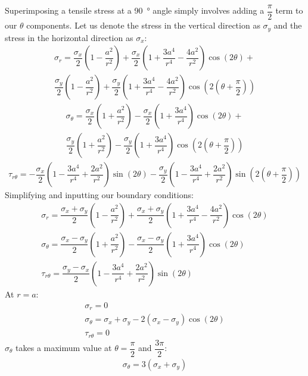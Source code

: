 \documentclass[11pt]{article}
\numberwithin{equation}{section}
\begin{document}
Superimposing a tensile stress at a \SI{90}{\degree} angle simply involves adding a $\dfrac{\pi}{2}$ term to our $\theta$ components. Let us denote the stress in the vertical direction as $\sigma_y$ and the stress in the horizontal direction as $\sigma_x$:
\begin{multline}
    \sigma_r = \dfrac{\sigma_x}{2}\left(1 - \dfrac{a^2}{r^2}\right) + \dfrac{\sigma_x}{2}\left(1+\dfrac{3a^4}{r^4}-\dfrac{4a^2}{r^2}\right)\cos\left(2\theta\right) + \\\dfrac{\sigma_y}{2}\left(1 - \dfrac{a^2}{r^2}\right) + \dfrac{\sigma_y}{2}\left(1+\dfrac{3a^4}{r^4}-\dfrac{4a^2}{r^2}\right)\cos\left(2\left(\theta + \dfrac{\pi}{2}\right)\right)
\end{multline}
\begin{multline}
    \sigma_{\theta} = \dfrac{\sigma_x}{2}\left(1 + \dfrac{a^2}{r^2}\right) - \dfrac{\sigma_x}{2}\left(1 + \dfrac{3a^4}{r^4}\right)\cos \left(2\theta\right) + \\ \dfrac{\sigma_y}{2}\left(1 + \dfrac{a^2}{r^2}\right) - \dfrac{\sigma_y}{2}\left(1 + \dfrac{3a^4}{r^4}\right)\cos \left(2\left(\theta + \dfrac{\pi}{2}\right)\right)
\end{multline}
\begin{gather}
    \tau_{r\theta} = -\dfrac{\sigma_x}{2}\left(1 - \dfrac{3a^4}{r^4}+\dfrac{2a^2}{r^2}\right)\sin\left(2\theta\right) -\dfrac{\sigma_y}{2}\left(1 - \dfrac{3a^4}{r^4}+\dfrac{2a^2}{r^2}\right)\sin\left(2\left(\theta + \dfrac{\pi}{2}\right)\right)
\end{gather}
Simplifying and inputting our boundary conditions:
\begin{gather}
    \sigma_r = \dfrac{\sigma_x + \sigma_y}{2}\left(1 - \dfrac{a^2}{r^2}\right) + \dfrac{\sigma_x + \sigma_y}{2}\left(1 + \dfrac{3a^4}{r^4}- \dfrac{4a^2}{r^2}\right)\cos \left(2\theta\right)\\
    \sigma_{\theta} = \dfrac{\sigma_x - \sigma_y}{2}\left(1 + \dfrac{a^2}{r^2}\right) - \dfrac{\sigma_x - \sigma_y}{2}\left(1 + \dfrac{3a^4}{r^4}\right)\cos\left(2\theta\right)\\
    \tau_{r\theta} = \dfrac{\sigma_y - \sigma_x}{2}\left(1 -\dfrac{3a^4}{r^4}+ \dfrac{2a^2}{r^2}\right)\sin\left(2\theta\right)
\end{gather}
At $r =a$:
\begin{gather}
    \sigma_r = 0\\
    \sigma_{\theta} = \sigma_x + \sigma_y - 2\left(\sigma_x - \sigma_y\right)\cos\left(2\theta\right)\\
    \tau_{r\theta} = 0
\end{gather}
$\sigma_{\theta}$ takes a maximum value at $\theta = \dfrac{\pi}{2}$ and $\dfrac{3\pi}{2}$:
\begin{gather}
    \sigma_{\theta} = 3\left(\sigma_x + \sigma_y\right)
\end{gather}
\end{document}
